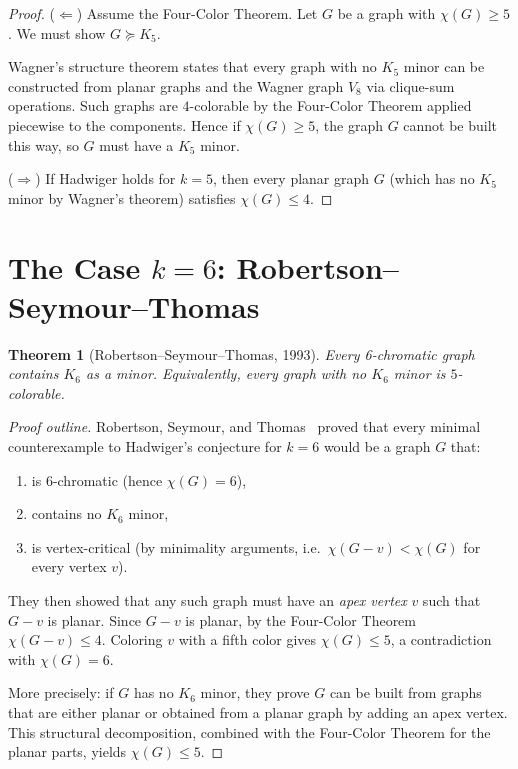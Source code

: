 \documentclass[12pt,a4paper]{amsart}
\newtheorem{theorem}{Theorem}[section]
\theoremstyle{definition}
\theoremstyle{remark}
\begin{document}
\begin{proof}
($\Leftarrow$) Assume the Four-Color Theorem. Let $G$ be a graph with $\chi(G) \geq 5$.
We must show $G \succeq K_5$.

Wagner's structure theorem states that every graph with no $K_5$ minor can
be constructed from planar graphs and the Wagner graph $V_8$ via clique-sum
operations. Such graphs are $4$-colorable by the Four-Color Theorem applied
piecewise to the components. Hence if $\chi(G) \geq 5$, the graph $G$
cannot be built this way, so $G$ must have a $K_5$ minor.

($\Rightarrow$) If Hadwiger holds for $k=5$, then every planar graph $G$
(which has no $K_5$ minor by Wagner's theorem) satisfies $\chi(G) \leq 4$.
\end{proof}

\section{The Case \texorpdfstring{$k = 6$}{k=6}: Robertson--Seymour--Thomas}

\begin{theorem}[Robertson--Seymour--Thomas, 1993]\label{thm:k6}
Every 6-chromatic graph contains $K_6$ as a minor. Equivalently, every graph
with no $K_6$ minor is $5$-colorable.
\end{theorem}

\begin{proof}[Proof outline]
Robertson, Seymour, and Thomas~\cite{RST93} proved that every minimal
counterexample to Hadwiger's conjecture for $k = 6$ would be a graph $G$ that:
\begin{enumerate}[label=(\roman*)]
  \item is $6$-chromatic (hence $\chi(G) = 6$),
  \item contains no $K_6$ minor,
  \item is vertex-critical (by minimality arguments, i.e.\ $\chi(G - v) < \chi(G)$ for every vertex $v$).
\end{enumerate}

They then showed that any such graph must have an \emph{apex vertex} $v$ such
that $G - v$ is planar. Since $G - v$ is planar, by the Four-Color Theorem
$\chi(G - v) \leq 4$. Coloring $v$ with a fifth color gives $\chi(G) \leq 5$,
a contradiction with $\chi(G) = 6$.

More precisely: if $G$ has no $K_6$ minor, they prove $G$ can be built from
graphs that are either planar or obtained from a planar graph by adding an apex
vertex. This structural decomposition, combined with the Four-Color Theorem
for the planar parts, yields $\chi(G) \leq 5$.
\end{proof}
\end{document}
